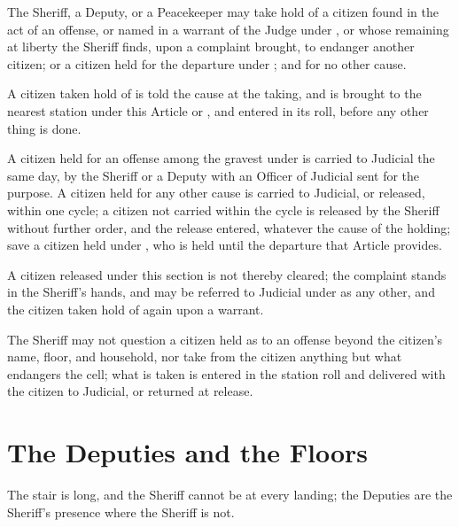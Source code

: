 \begin{clauses}
\item The Sheriff, a Deputy, or a Peacekeeper may take hold of a citizen found in the act of an offense, or named in a warrant of the Judge under , or whose remaining at liberty the Sheriff finds, upon a complaint brought, to endanger another citizen; or a citizen held for the departure under ; and for no other cause.
\item A citizen taken hold of is told the cause at the taking, and is brought to the nearest station under this Article or , and entered in its roll, before any other thing is done.
\item A citizen held for an offense among the gravest under  is carried to Judicial the same day, by the Sheriff or a Deputy with an Officer of Judicial sent for the purpose. A citizen held for any other cause is carried to Judicial, or released, within one cycle; a citizen not carried within the cycle is released by the Sheriff without further order, and the release entered, whatever the cause of the holding; save a citizen held under , who is held until the departure that Article provides.
\item A citizen released under this section is not thereby cleared; the complaint stands in the Sheriff's hands, and may be referred to Judicial under  as any other, and the citizen taken hold of again upon a warrant.
\item The Sheriff may not question a citizen held as to an offense beyond the citizen's name, floor, and household, nor take from the citizen anything but what endangers the cell; what is taken is entered in the station roll and delivered with the citizen to Judicial, or returned at release.
\end{clauses}

\section{The Deputies and the Floors}
\label{sec:sheriff:deputies-and-the-floors}

The stair is long, and the Sheriff cannot be at every landing; the Deputies are the Sheriff's presence where the Sheriff is not.


